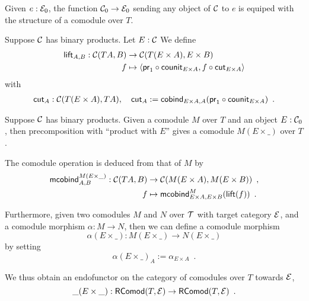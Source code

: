 \documentclass{amsart}
\begin{document}
\begin{definition}
  Given $e:\E_0$, the function $\C_0\to\E_0$ sending any object of $\C$ to $e$ is equiped with
  the structure of a comodule over $T$.
\end{definition}



\begin{definition}
 Suppose $\C$ has binary products. Let $E : \C$
 We define
 \begin{align*} \lift_{A,B} : \C(TA,B) &\to \C(T(E\times A),E\times B)\\
                                   f   &\mapsto \langle \comp{\counit_{E\times A}}{\pr_1}, \comp{\cut_{E\times A}}{f} \rangle
\end{align*}
with 
\begin{align*}
               \cut_A: \C(T(E\times A), TA), \quad \cut_A := \cobind_{E \times A, A}(\comp{\counit_{E \times A}}{\pr_1}) \enspace .
\end{align*}



\end{definition}



\begin{definition}\label{def:product_in_context}
 Suppose $\C$ has binary products.
 Given a comodule $M$ over $T$ and an object $E:\C_0$, then precomposition with \enquote{product with $E$}
 gives a comodule $M(E\times\_)$ over $T$.
 
 The comodule operation is deduced from that of $M$ by 
 \begin{align*} \mcobind^{M(E\times\_)}_{A,B} : \C(TA,B)&\to \C(M(E\times A), M(E\times B)) \enspace ,\\
                                                      f &\mapsto \mcobind^M_{E\times A,E\times B}(\lift(f)) \enspace .
  \end{align*}                                        

 \noindent
 Furthermore, given two comodules $M$ and $N$ over $\T$ with target category $\E$, and a comodule morphism $\alpha : M \to N$, then 
 we can define a comodule morphism \[\alpha(E\times \_) : M(E\times \_) \to N(E\times \_) \] by setting
          \[ \alpha(E \times \_)_A := \alpha_{E\times A} \enspace . \]
  
  \noindent
  We thus obtain an endofunctor on the category of comodules over $T$ towards $\E$,
   \[  \_ (E\times \_) : \RComod(T,\E) \to \RComod(T,\E) \enspace . \]
 

\end{definition}
\end{document}

